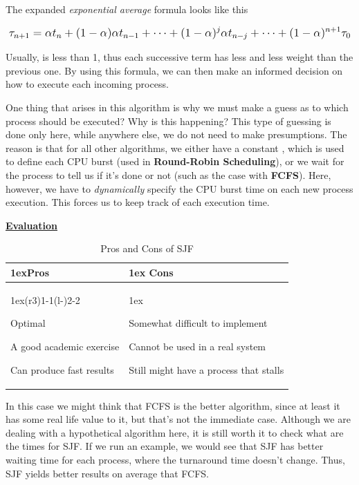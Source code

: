 \documentclass{article}
\newcommand{\code}[1]{\codeinline{\texttt{#1}}}
\begin{document}
The expanded \textit{exponential average} formula looks like this

\begin{equation}
  \mathlarger{\tau_{n+1} = \alpha t_{n} + (1 - \alpha)\alpha t_{n - 1} + \dots + (1 - \alpha)^{j} \alpha t_{n - j} + \dots + (1 - \alpha)^{n + 1} \tau_{0}}
\end{equation}

Usually, \scalebox{1.1}{\(\alpha\)} is less than 1, thus each successive term has less and less weight than the previous one. By using this formula, we can then make an informed decision on how to execute each incoming process.

One thing that arises in this algorithm is why we must make a guess as to which process should be executed? Why is this happening? This type of guessing is done only here, while anywhere else, we do not need to make presumptions. The reason is that for all other algorithms, we either have a constant \code{TIME\_QUANTUM}, which is used to define each CPU burst (used in \textbf{Round-Robin Scheduling}), or we wait for the process to tell us if it's done or not (such as the case with \textbf{FCFS}). Here, however, we have to \textit{dynamically} specify the CPU burst time on each new process execution. This forces us to keep track of each execution time.

\underline{\textbf{Evaluation}}

\begin{table}[H]
  \begin{tabularx}{\linewidth}{>{\parskip1ex}X@{\kern4\tabcolsep}>{\parskip1ex}X}
    \toprule
    \hfil\bfseries Pros & \hfil\bfseries Cons \\
    \cmidrule(r{3\tabcolsep}){1-1}\cmidrule(l{-\tabcolsep}){2-2}

    Optimal\par
    A good academic exercise\par
    Can produce fast results\par

    &

    Somewhat difficult to implement\par
    Cannot be used in a real system\par
    Still might have a process that stalls \\
    \bottomrule
  \end{tabularx}
  \caption{Pros and Cons of SJF}
\end{table}

In this case we might think that FCFS is the better algorithm, since at least it has some real life value to it, but that's not the immediate case. Although we are dealing with a hypothetical algorithm here, it is still worth it to check what are the times for SJF. If we run an example, we would see that SJF has better waiting time for each process, where the turnaround time doesn't change. Thus, SJF yields better results on average that FCFS.
\end{document}
